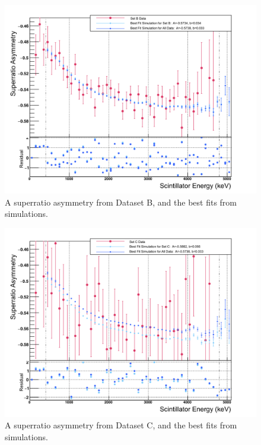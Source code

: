 %
\begin{figure}[htb]
	\centering
	\includegraphics[width=.999\linewidth]
	{Figures/BestAsymmetry_SetB.png}
	\caption[SetB Superratio Asymmetry]{A superratio asymmetry from Dataset B, and the best fits from simulations.}	
	\label{fig:asymmetryB}
\end{figure}
%
\begin{figure}[htb]
	\centering
	\includegraphics[width=.999\linewidth]
	{Figures/BestAsymmetry_SetC.png}
	\caption[SetC Superratio Asymmetry]{A superratio asymmetry from Dataset C, and the best fits from simulations.}	
	\label{fig:asymmetryC}
\end{figure}
%	
